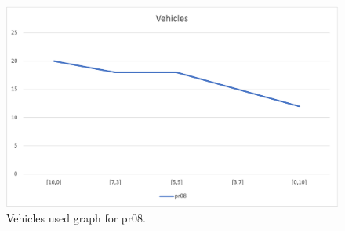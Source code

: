 \begin{figure}[H]
    \centering
    \includegraphics[width=1.0\columnwidth]{../graphs/pr08-vehicles.png}
    \caption{Vehicles used graph for pr08.}
\end{figure}
